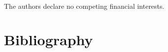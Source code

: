 \documentclass[times, twoside]{zHenriquesLab-StyleBioRxiv}
\begin{document}
\begin{interests}
The authors declare no competing financial interests.
\end{interests}

\section*{Bibliography}


\onecolumn
\newpage


\end{document}

